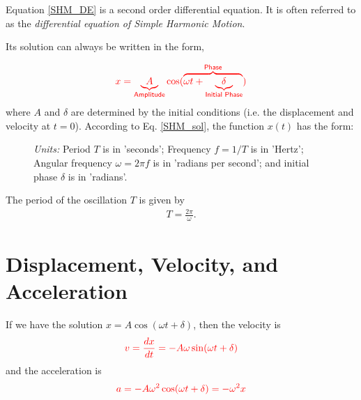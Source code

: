 Equation \eqref{SHM_DE} is a second order differential equation. It is often referred to as the \emph{differential equation of Simple Harmonic Motion}. 

Its solution can always be written in the form, 

\begin{align}
\textcolor{red}{x = \underbrace{A}_{\textsf{Amplitude}} \cos(\overbrace{\omega t + \underbrace{\delta}_{\textsf{Initial Phase}}}^{\textsf{Phase}})} \label{SHM_sol}
\end{align}
where $A$ and $\delta$ are determined by the initial conditions (i.e. the displacement and velocity at $t = 0$). 
According to Eq. \eqref{SHM_sol}, the function $x(t)$ has the form:
\begin{figure}
\caption{\emph{Units:} Period $T$ is in 'seconds'; Frequency $f = 1/T$ is in 'Hertz'; Angular frequency $\omega = 2\pi f$ is in 'radians per second'; and initial phase $\delta$ is in 'radians'.}
\end{figure}

The period of the oscillation $T$ is given by 
\begin{align}
T = \frac{2\pi}{\omega}.
\end{align}

\section{Displacement, Velocity, and Acceleration}
If we have the solution $x = A \cos(\omega t + \delta)$, then the velocity is 
\begin{align}
\textcolor{red}{v = \frac{dx}{dt} = - A \omega \sin(\omega t + \delta)}
\end{align}
and the acceleration is  
\begin{align}
\textcolor{red}{a = -A\omega^2 \cos(\omega t + \delta) = -\omega^2 x}
\end{align}

